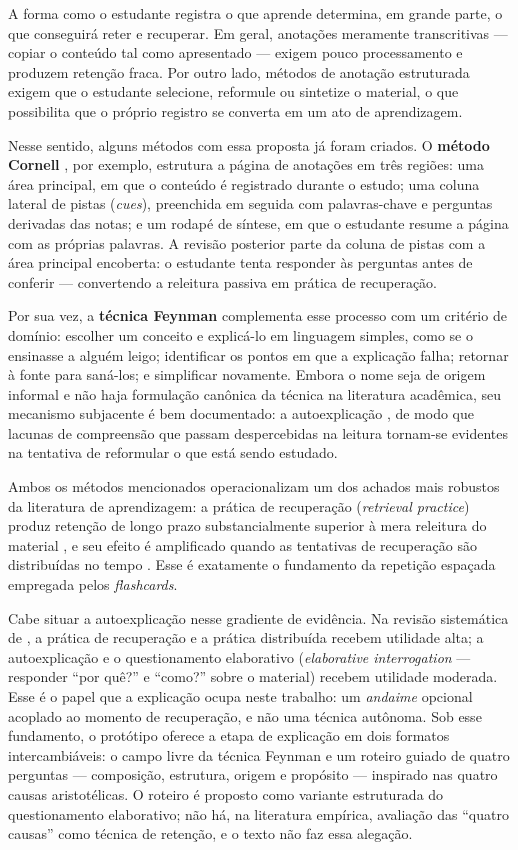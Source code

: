 \documentclass[12pt, %
openright, 
oneside,
a4paper,
english,   %
brazil]{facom-ufu-abntex2}
\begin{document}
A forma como o estudante registra o que aprende determina, em grande parte, o
que conseguirá reter e recuperar. Em geral, anotações meramente transcritivas
--- copiar o conteúdo tal como apresentado --- exigem pouco processamento e
produzem retenção fraca. Por outro lado, métodos de anotação estruturada
exigem que o estudante selecione, reformule ou sintetize o material, o que
possibilita que o próprio registro se converta em um ato de aprendizagem.

Nesse sentido, alguns métodos com essa proposta já foram criados. O
\textbf{método Cornell} \cite{PaukOwens2010}, por exemplo, estrutura a página
de anotações em três regiões: uma área principal, em que o conteúdo é
registrado durante o estudo; uma coluna lateral de pistas (\textit{cues}),
preenchida em seguida com palavras-chave e perguntas derivadas das notas; e um
rodapé de síntese, em que o estudante resume a página com as próprias
palavras. A revisão posterior parte da coluna de pistas com a área principal
encoberta: o estudante tenta responder às perguntas antes de conferir ---
convertendo a releitura passiva em prática de recuperação.

Por sua vez, a \textbf{técnica Feynman} complementa esse processo com um
critério de domínio: escolher um conceito e explicá-lo em linguagem simples,
como se o ensinasse a alguém leigo; identificar os pontos em que a explicação
falha; retornar à fonte para saná-los; e simplificar novamente. Embora o nome
seja de origem informal e não haja formulação canônica da técnica na
literatura acadêmica, seu mecanismo subjacente é bem documentado: a
autoexplicação \cite{Chi1994}, de modo que lacunas de compreensão que passam
despercebidas na leitura tornam-se evidentes na tentativa de reformular o que
está sendo estudado.

Ambos os métodos mencionados operacionalizam um dos achados mais robustos da
literatura de aprendizagem: a prática de recuperação (\textit{retrieval
practice}) produz retenção de longo prazo substancialmente superior à mera
releitura do material \cite{RoedigerKarpicke2006}, e seu efeito é amplificado
quando as tentativas de recuperação são distribuídas no tempo
\cite{Cepeda2006}. Esse é exatamente o fundamento da repetição espaçada
empregada pelos \textit{flashcards}.

Cabe situar a autoexplicação nesse gradiente de evidência. Na revisão
sistemática de , a prática de recuperação e
a prática distribuída recebem utilidade alta; a autoexplicação e o
questionamento elaborativo (\textit{elaborative interrogation} --- responder
``por quê?'' e ``como?'' sobre o material) recebem utilidade moderada. Esse é
o papel que a explicação ocupa neste trabalho: um \emph{andaime} opcional
acoplado ao momento de recuperação, e não uma técnica autônoma. Sob esse
fundamento, o protótipo oferece a etapa de explicação em dois formatos
intercambiáveis: o campo livre da técnica Feynman e um roteiro guiado de
quatro perguntas --- composição, estrutura, origem e propósito --- inspirado
nas quatro causas aristotélicas. O roteiro é proposto como variante
estruturada do questionamento elaborativo; não há, na literatura empírica,
avaliação das ``quatro causas'' como técnica de retenção, e o texto não faz
essa alegação.
\end{document}
